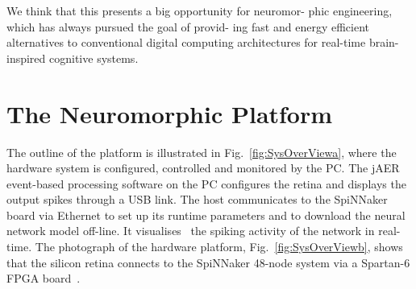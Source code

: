 

We think that this presents a big opportunity for neuromor-
phic engineering, which has always pursued the goal of provid-
ing fast and energy efficient alternatives to conventional digital
computing architectures for real-time brain-inspired cognitive systems.




\section{The Neuromorphic Platform}
\label{sec:np}
The outline of the platform is illustrated in Fig.~\ref{fig:SysOverViewa}, where the hardware system is configured, controlled and monitored by the PC.
The jAER~\cite{delbruck2008frame} event-based processing software on the PC configures the retina and displays the output spikes through a USB link.
The host communicates to the SpiNNaker board via Ethernet to set up its runtime parameters and to download the neural network model off-line.
It visualises~\cite{6252490} the spiking activity of the network in real-time.
The photograph of the hardware platform, Fig.~\ref{fig:SysOverViewb}, shows that the silicon retina connects to the SpiNNaker 48-node system via a Spartan-6 FPGA board~\cite{galluppi2012real}.



